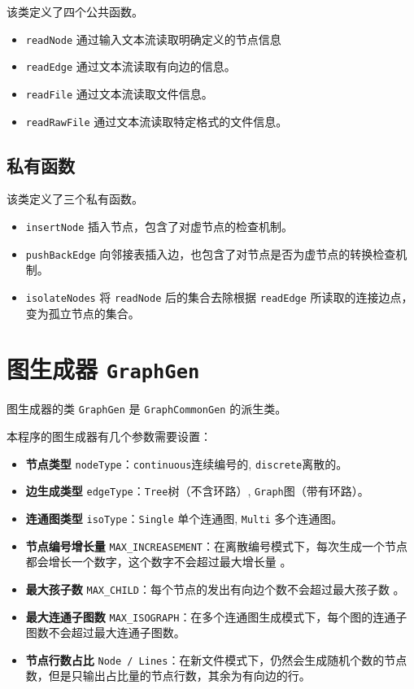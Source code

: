 \documentclass[a4paper,12pt]{article}
\begin{document}
\begin{CJK}{UTF8}{song}
该类定义了四个公共函数。
\begin{itemize}
    \item \texttt{readNode} 通过输入文本流读取明确定义的节点信息
    \item \texttt{readEdge} 通过文本流读取有向边的信息。
    \item \texttt{readFile} 通过文本流读取文件信息。
    \item \texttt{readRawFile} 通过文本流读取特定格式的文件信息。
\end{itemize}

\subsection{私有函数}

该类定义了三个私有函数。
\begin{itemize}
    \item \texttt{insertNode} 插入节点，包含了对虚节点的检查机制。
    \item \texttt{pushBackEdge} 向邻接表插入边，也包含了对节点是否为虚节点的转换检查机制。
    \item \texttt{isolateNodes} 将 \texttt{readNode} 后的集合去除根据 \texttt{readEdge} 所读取的连接边点，变为孤立节点的集合。
\end{itemize}


\section{图生成器 \texttt{GraphGen}}

图生成器的类 \texttt{GraphGen} 是 \texttt{GraphCommonGen} 的派生类。

本程序的图生成器有几个参数需要设置：

\begin{itemize}
\item
  \textbf{节点类型} \texttt{nodeType}：\texttt{continuous}连续编号的,
  \texttt{discrete}离散的。
\item
  \textbf{边生成类型} \texttt{edgeType}：\texttt{Tree}树（不含环路）,
  \texttt{Graph}图（带有环路）。
\item
  \textbf{连通图类型} \texttt{isoType}：\texttt{Single} 单个连通图,
  \texttt{Multi} 多个连通图。
\item
  \textbf{节点编号增长量}
  \texttt{MAX\_INCREASEMENT}：在离散编号模式下，每次生成一个节点都会增长一个数字，这个数字不会超过最大增长量
  。
\item
  \textbf{最大孩子数}
  \texttt{MAX\_CHILD}：每个节点的发出有向边个数不会超过最大孩子数 。
\item
  \textbf{最大连通子图数}
  \texttt{MAX\_ISOGRAPH}：在多个连通图生成模式下，每个图的连通子图数不会超过最大连通子图数。
\item
  \textbf{节点行数占比}
  \texttt{Node\ /\ Lines}：在新文件模式下，仍然会生成随机个数的节点数，但是只输出占比量的节点行数，其余为有向边的行。
\end{itemize}


\end{CJK}
\end{document}
